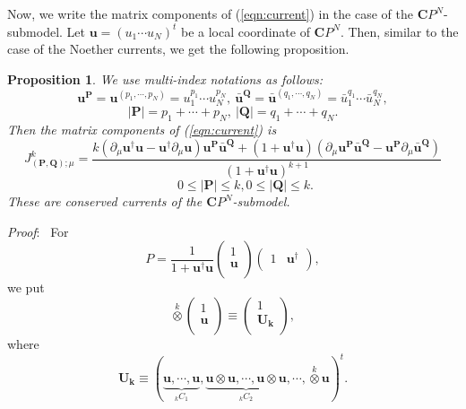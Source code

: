 \documentclass[makeidx,12pt,openany]{report}
\newtheorem{prop}[df]{Proposition}
\begin{document}
Now, we write the matrix components of (\ref{eqn:current}) in the case of 
the ${\mathbf{C}}P^N$-submodel. Let ${\mathbf{u}}=(u_1\cdots u_N)^t$ be a 
local coordinate of ${\mathbf{C}}P^N$. Then, similar to the case of 
the Noether currents, we get the following proposition. 
\begin{prop}
We use multi-index notations as follows:
$$ {\mathbf{u}}^{\mathbf{P}}
    ={\mathbf{u}}^{(p_1,\cdots ,p_N)}
    =u_1^{p_1}\cdots u_N^{p_N}, \ 
   \bar{\mathbf{u}}^{\mathbf{Q}}
    =\bar{\mathbf{u}}^{(q_1,\cdots ,q_N)}
    =\bar{u}_1^{q_1}\cdots \bar{u}_N^{q_N}, $$
$$  |{\mathbf{P}}|=p_1+\cdots +p_N, \ 
    |{\mathbf{Q}}|=q_1+\cdots +q_N. $$
Then the matrix components of (\ref{eqn:current}) is 
\begin{equation}
 J^k_{(\mathbf{P},\mathbf{Q});{\mu}}
  =\frac{
    k(\partial_{\mu}{\mathbf{u}}^{\dag}{\mathbf{u}}
       -{\mathbf{u}}^{\dag}\partial_{\mu}{\mathbf{u}})
     {\mathbf{u}}^{\mathbf{P}}\bar{\mathbf{u}}^{\mathbf{Q}}
    +(1+{\mathbf{u}}^{\dag}\mathbf{u})
      (\partial_{\mu}{\mathbf{u}}^{\mathbf{P}}\bar{\mathbf{u}}^{\mathbf{Q}}
      -{\mathbf{u}}^{\mathbf{P}}\partial_{\mu}\bar{\mathbf{u}}^{\mathbf{Q}})}
   {(1+{\mathbf{u}}^{\dag}{\mathbf{u}})^{k+1}}
  \label{eqn:tensorcpN}
\end{equation}
$$\qquad 0\le |{\mathbf{P}}| \le k,0 \le |{\mathbf{Q}}| \le k .$$
These are conserved currents of the ${\mathbf{C}}P^N$-submodel. 
\end{prop}
\textit{Proof}: \ 
For
$$
P=\frac{1}{1+\mathbf{u}^{\dag}\mathbf{u}}
 \left(
 \begin{array}{c}
     1       \\
  \mathbf{u} \\
 \end{array}
 \right)
 \left(
 \begin{array}{cc}
     1  & \mathbf{u}^{\dag} \\
 \end{array}
 \right) , 
$$
we put 
$$
\stackrel{k}{\otimes} \! 
 \left(
 \begin{array}{c}
     1       \\
  \mathbf{u} \\
 \end{array}
 \right) 
\equiv 
 \left(
 \begin{array}{c}
     1       \\
  \mathbf{U_k} \\
 \end{array}
 \right) , 
$$
where 
$$
\mathbf{U_k} \equiv (\underbrace{\mathbf{u},\cdots,\mathbf{u}}_{{}_k C_1},
 \underbrace{\mathbf{u} \otimes \mathbf{u},\cdots,
  \mathbf{u} \otimes \mathbf{u}}_{{}_k C_2},
\cdots,\stackrel{k}{\otimes} \! \mathbf{u})^t. 
$$ 
\end{document}
